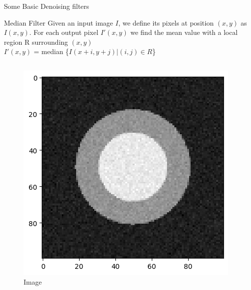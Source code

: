 \documentclass{beamer}
\begin{document}
\begin{frame}{Some Basic Denoising filters}
    \begin{block}{Median Filter}
    Given an input image $I$, we define its pixels at position $(x,y)$  as $I(x,y)$.
For each output pixel  $I'(x,y)$  we find the mean value with a local region R  surrounding $(x,y)$\\ 
$I'(x,y)$ = median \{$I(x+i,y+j)|(i, j) \in R$\}
    \end{block}
    
    \begin{columns}
            \begin{figure}
                \centering
                \includegraphics[scale = 0.4]{img/noisy_im.png}
                \caption{Image}
                \label{fig:dual fig demo 1}
            \end{figure}
            

\end{columns}
\end{frame}
\end{document}
